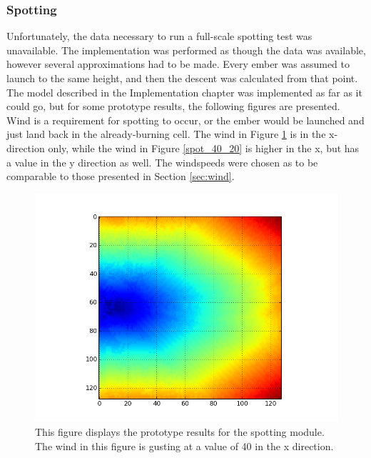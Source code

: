 \subsubsection{Spotting}
Unfortunately, the data necessary to run a full-scale spotting test was unavailable. The implementation was performed as though the data was available, however several approximations had to be made. Every ember was assumed to launch to the same height, and then the descent was calculated from that point. The model described in the Implementation chapter was implemented as far as it could go, but for some prototype results, the following figures are presented. Wind is a requirement for spotting to occur, or the ember would be launched and just land back in the already-burning cell. The wind in Figure \ref{fig:spot_40} is in the x-direction only, while the wind in Figure \ref{spot_40_20} is higher in the x, but has a value in the y direction as well. The windspeeds were chosen as to be comparable to those presented in Section \ref{sec:wind}.
\begin{figure}%
\centering
  \includegraphics[height=.4\textheight]{figures/results/spot_40.png}
  \caption{This figure displays the prototype results for the spotting module. The wind in this figure is gusting at a value of 40 in the x direction.}
  \label{fig:spot_40}
\end{figure}  
